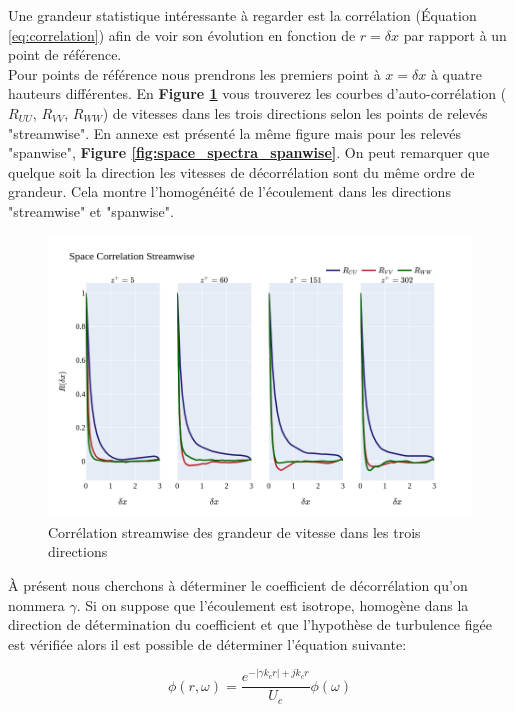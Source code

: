 \documentclass[12pt]{article}
\theoremstyle{plain}
\theoremstyle{remark}
\begin{document}
Une grandeur statistique intéressante à regarder est la corrélation (Équation \ref{eq:correlation}) afin de voir son évolution en fonction de $r=\delta x$ par rapport à un point de référence.\\
Pour points de référence nous prendrons les premiers point à $x=\delta x$ à quatre hauteurs différentes. En {\bf Figure \ref{fig:space_spectra}} vous trouverez les courbes d'auto-corrélation ($R_{UU}$, $R_{VV}$, $R_{WW}$) de vitesses dans les trois directions selon les points de relevés "streamwise". En annexe est présenté la même figure mais pour les relevés "spanwise", {\bf Figure \ref{fig:space_spectra_spanwise}}. On peut remarquer que quelque soit la direction les vitesses de décorrélation sont du même ordre de grandeur. Cela montre l'homogénéité de l'écoulement dans les directions "streamwise" et "spanwise". \\


\begin{figure}[H]
	\begin{center}
		\includegraphics[width=0.8\linewidth]{../../output/figures/channel_wrles_retau395/split_time/space_correlation/streamwise.png}
		\caption{Corrélation streamwise des grandeur de vitesse dans les trois directions}
		\label{fig:space_spectra}
	\end{center}
\end{figure}

À présent nous cherchons à déterminer le coefficient de décorrélation qu'on nommera $\gamma$. Si on suppose que l'écoulement est isotrope, homogène dans la direction de détermination du coefficient et que l'hypothèse de turbulence figée est vérifiée alors il est possible de déterminer l'équation suivante: 

\begin{equation}
	\phi(r, \omega) = \frac{e^{-|\gamma k_c r| + jk_cr}}{U_c}\phi(\omega)
	\label{eq:funct}
\end{equation} 
\end{document}
